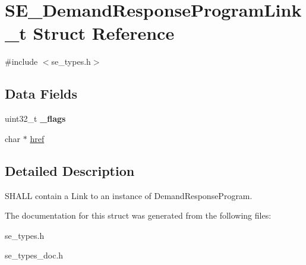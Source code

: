 \hypertarget{structSE__DemandResponseProgramLink__t}{}\section{S\+E\+\_\+\+Demand\+Response\+Program\+Link\+\_\+t Struct Reference}
\label{structSE__DemandResponseProgramLink__t}


{\ttfamily \#include $<$se\+\_\+types.\+h$>$}

\subsection*{Data Fields}
\begin{DoxyCompactItemize}
\item 
uint32\+\_\+t {\bfseries \+\_\+flags}
\item 
char $\ast$ \hyperlink{group__DemandResponseProgramLink_ga3fb41f1071a2390aac2c1158f71d3d10}{href}
\end{DoxyCompactItemize}


\subsection{Detailed Description}
S\+H\+A\+LL contain a Link to an instance of Demand\+Response\+Program. 

The documentation for this struct was generated from the following files\+:\begin{DoxyCompactItemize}
\item 
se\+\_\+types.\+h\item 
se\+\_\+types\+\_\+doc.\+h\end{DoxyCompactItemize}
